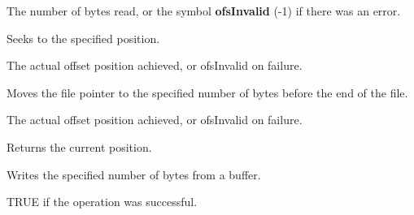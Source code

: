 
The number of bytes read, or the symbol {\bf ofsInvalid} (-1) if there was an error.

\label{wxfileseek}


Seeks to the specified position.





The actual offset position achieved, or ofsInvalid on failure.

\label{wxfileseekend}


Moves the file pointer to the specified number of bytes before the end of the file.




The actual offset position achieved, or ofsInvalid on failure.

\label{wxfiletell}


Returns the current position.

\label{wxfilewrite}


Writes the specified number of bytes from a buffer.





TRUE if the operation was successful.


